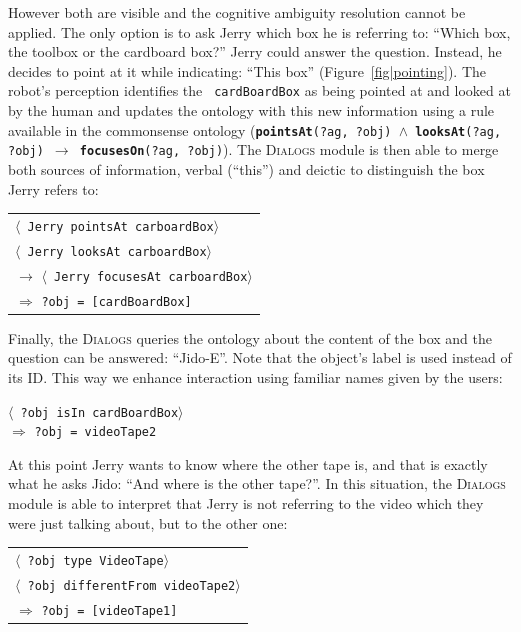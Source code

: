 \documentclass[preprint,3p,times]{elsarticle}
\newcommand{\concept}[1]{{\small \texttt{#1}}}
\newcommand{\stmt}[1]{{\footnotesize \tt $\langle$ #1\relax$\rangle$}}
\begin{document}
However both are visible and the cognitive ambiguity resolution cannot be
applied. The only option is to ask Jerry which box he is referring to: ``Which
box, the toolbox or the cardboard box?'' Jerry could answer the
question. Instead, he decides to point at it while indicating: ``This box''
(Figure~\ref{fig|pointing}). The robot's perception identifies the {\tt
cardBoardBox} as being pointed at and looked at by the human and updates the
ontology with this new information using a rule available in the commonsense
ontology ({\tt \textbf{pointsAt}(?ag, ?obj) $\land$ \textbf{looksAt}(?ag, ?obj) $\to$
\textbf{focusesOn}(?ag, ?obj)}). The \textsc{Dialogs} module is then able to merge both
sources of information, verbal (``this'') and deictic to distinguish the box
Jerry refers to:
\begin{center}
\begin{tabular}{l}
\stmt{Jerry pointsAt carboardBox}\\
\stmt{Jerry looksAt carboardBox}\\
$\to$ \stmt{Jerry focusesAt carboardBox}\\
\hspace{0.7cm}$\Rightarrow$ {\tt ?obj = [cardBoardBox]}
\end{tabular}
\end{center}

Finally, the \textsc{Dialogs} queries the ontology about the content of the box
and the question can be answered: ``Jido-E''. Note that the object's label is
used instead of its ID. This way we enhance interaction using familiar names
given by the users:

\begin{center}
\stmt{?obj isIn cardBoardBox}\\
\hspace{0.7cm}$\Rightarrow$ \concept{?obj = videoTape2}\\
\end{center}

At this point Jerry wants to know where the other tape is, and that is exactly
what he asks Jido: ``And where is the other tape?''. In this situation, the
\textsc{Dialogs} module is able to interpret that Jerry is not referring to the
video which they were just talking about, but to the other one:

\begin{center}
\begin{tabular}{l}
\stmt{?obj type VideoTape}\\
\stmt{?obj differentFrom videoTape2}\\
\hspace{0.7cm}$\Rightarrow$ \concept{?obj = [videoTape1]}
\end{tabular}
\end{center}
\end{document}
